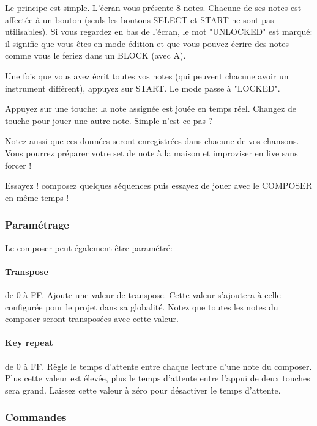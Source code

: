 \documentclass[12pt,a4paper]{article}
\begin{document}
    Le principe est simple. L'écran vous présente 8 notes. Chacune de ses notes est affectée à un bouton (seuls les boutons SELECT et START ne sont pas utilisables). Si vous regardez en bas de l'écran, le mot "UNLOCKED" est marqué: il signifie que vous êtes en mode édition et que vous pouvez écrire des notes comme vous le feriez dans un BLOCK (avec A). \medskip
    
    Une fois que vous avez écrit toutes vos notes (qui peuvent chacune avoir un instrument différent), appuyez sur START. Le mode passe à "LOCKED".\medskip
    
    Appuyez sur une touche: la note assignée est jouée en temps réel. Changez de touche pour jouer une autre note. Simple n'est ce pas ?\medskip
    
    Notez aussi que ces données seront enregistrées dans chacune de vos chansons. Vous pourrez préparer votre set de note à la maison et improviser en live sans forcer !\medskip
    
    Essayez ! composez quelques séquences puis essayez de jouer avec le COMPOSER en même temps !\medskip
    
    \subsubsection{Paramétrage}
    
    Le composer peut également être paramétré:
    
    
        \paragraph{Transpose} de 0 à FF. Ajoute une valeur de transpose. Cette valeur s'ajoutera à celle configurée pour le projet dans sa globalité. Notez que toutes les notes du composer seront transposées avec cette valeur.
        
        \paragraph{Key repeat} de 0 à FF. Règle le temps d'attente entre chaque lecture d'une note du composer. Plus cette valeur est élevée, plus le temps d'attente entre l'appui de deux touches sera grand. Laissez cette valeur à zéro pour désactiver le temps d'attente.
    
        \subsubsection{Commandes}
        
\end{document}
